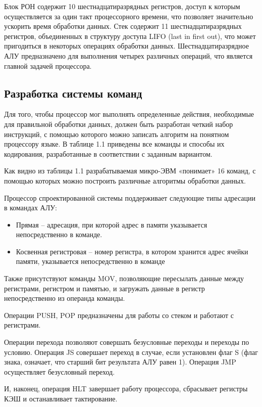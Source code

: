 Блок РОН содержит 10 шестнадцатиразрядных регистров, доступ к которым осуществляется за один такт процессорного времени, что позволяет значительно ускорить время обработки данных. Стек содержит 11 шестнадцатиразрядных регистров, объединенных в структуру доступа LIFO (last in first out), что может пригодиться в некоторых операциях обработки данных. Шестнадцатиразрядное АЛУ предназначено для выполнения четырех различных операций, что является главной задачей процессора.

\subsection{Разработка системы команд}
Для того, чтобы процессор мог выполнять определенные действия, необходимые для правильной обработки данных, должен быть разработан четкий набор инструкций, с помощью которого можно записать алгоритм на понятном процессору языке. В таблице 1.1 приведены все команды и способы их кодирования, разработанные в соответствии с заданным вариантом.

Как видно из таблицы 1.1  разрабатываемая микро-ЭВМ «понимает» 16 команд, с помощью которых можно построить различные алгоритмы обработки данных.

Процессор спроектированной системы поддерживает следующие типы адресации в командах АЛУ:
\begin{itemize}
    \item Прямая – адресация, при которой адрес в памяти указывается непосредственно в команде.
    \item Косвенная регистровая – номер регистра, в котором хранится адрес ячейки памяти, указывается непосредственно в команде
\end{itemize}
Также присутствуют команды MOV, позволяющие пересылать данные между регистрами, регистром и памятью, и загружать данные в регистр непосредственно из операнда команды.

Операции PUSH, POP предназначены для работы со стеком и работают с регистрами.

Операции перехода позволяют совершать безусловные переходы и переходы по условию. Операция JS совершает переход в случае, если установлен флаг S (флаг знака, означает, что старший бит результата АЛУ равен 1).
Операция JMP осуществляет безусловный переход.

И, наконец, операция HLT завершает работу процессора, сбрасывает регистры КЭШ и останавливает тактирование.

